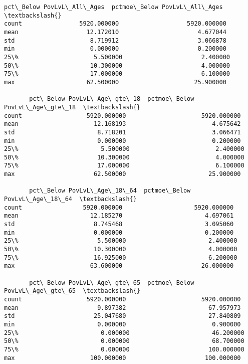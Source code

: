 \documentclass[11pt]{article}
\begin{document}
    \begin{Verbatim}[commandchars=\\\{\}]
       pct\_Below PovLvL\_All\_Ages  pctmoe\_Below PovLvL\_All\_Ages  \textbackslash{}
count                5920.000000                   5920.000000   
mean                   12.172010                      4.677044   
std                     8.719912                      3.066878   
min                     0.000000                      0.200000   
25\%                     5.500000                      2.400000   
50\%                    10.300000                      4.000000   
75\%                    17.000000                      6.100000   
max                    62.500000                     25.900000   

       pct\_Below PovLvL\_Age\_gte\_18  pctmoe\_Below PovLvL\_Age\_gte\_18  \textbackslash{}
count                  5920.000000                     5920.000000   
mean                     12.168193                        4.675642   
std                       8.718201                        3.066471   
min                       0.000000                        0.200000   
25\%                       5.500000                        2.400000   
50\%                      10.300000                        4.000000   
75\%                      17.000000                        6.100000   
max                      62.500000                       25.900000   

       pct\_Below PovLvL\_Age\_18\_64  pctmoe\_Below PovLvL\_Age\_18\_64  \textbackslash{}
count                 5920.000000                    5920.000000   
mean                    12.185270                       4.697061   
std                      8.745468                       3.095060   
min                      0.000000                       0.200000   
25\%                      5.500000                       2.400000   
50\%                     10.300000                       4.000000   
75\%                     16.925000                       6.200000   
max                     63.600000                      26.000000   

       pct\_Below PovLvL\_Age\_gte\_65  pctmoe\_Below PovLvL\_Age\_gte\_65  \textbackslash{}
count                  5920.000000                     5920.000000   
mean                      9.897382                       67.957973   
std                      25.047680                       27.840809   
min                       0.000000                        0.900000   
25\%                       0.000000                       46.200000   
50\%                       0.000000                       68.700000   
75\%                       0.000000                      100.000000   
max                     100.000000                      100.000000   


\end{Verbatim}
\end{document}
